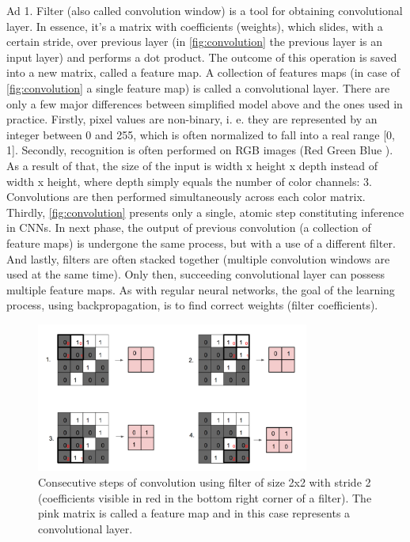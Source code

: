 \documentclass[11pt]{article}
\begin{document}
Ad 1. Filter (also called convolution window) is a tool for obtaining convolutional layer. In essence, it's a matrix with coefficients (weights), which slides, with a certain stride, over previous layer (in \autoref{fig:convolution} the previous layer is an input layer) and performs a dot product. The outcome of this operation is saved into a new matrix, called a feature map. A collection of features maps (in case of \autoref{fig:convolution} a single feature map) is called a convolutional layer. There are only a few major differences between simplified model above and the ones used in practice. Firstly, pixel values are non-binary, i. e. they are represented by an integer between 0 and 255, which is often normalized to fall into a real range [0, 1]. Secondly, recognition is often performed on RGB images (Red Green Blue \cite{rgb_def}). As a result of that, the size of the input is width x height x depth instead of width x height, where depth simply equals the number of color channels: 3. Convolutions are then performed simultaneously across each color matrix. Thirdly, \autoref{fig:convolution} presents only a single, atomic step constituting inference in CNNs. In next phase, the output of previous convolution (a collection of feature maps) is undergone the same process, but with a use of a different filter. And lastly, filters are often stacked together (multiple convolution windows are used at the same time). Only then, succeeding convolutional layer can possess multiple feature maps. As with regular neural networks, the goal of the learning process, using backpropagation, is to find correct weights (filter coefficients).\\

\begin{figure}[h]
\includegraphics[width=0.8\textwidth]{convolution}
\centering
\caption{Consecutive steps of convolution using filter of size 2x2 with stride 2 (coefficients visible in red in the bottom right corner of a filter). The pink matrix is called a feature map and in this case represents a convolutional layer.}
\label{fig:convolution}
\end{figure}
\end{document}
